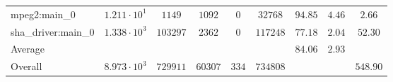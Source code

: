 \begin{tabular}{|l|c|c|c|c|c|c|c|c|}
mpeg2:main\_0           & $ 1.211 \cdot 10^{1} $ & $ 1149   $ & $ 1092  $ & $ 0   $ & $ 32768  $ & $ 94.85       $ & $ 4.46    $ & $ 2.66    $ \\
sha\_driver:main\_0     & $ 1.338 \cdot 10^{3} $ & $ 103297 $ & $ 2362  $ & $ 0   $ & $ 117248 $ & $ 77.18       $ & $ 2.04    $ & $ 52.30   $ \\
\hline
Average                 & $                    $ & $        $ & $       $ & $     $ & $        $ & $ 84.06       $ & $ 2.93    $ & $         $ \\
\hline
Overall                 & $ 8.973 \cdot 10^{3} $ & $ 729911 $ & $ 60307 $ & $ 334 $ & $ 734808 $ & $             $ & $         $ & $ 548.90  $ \\
\hline
\end{tabular}
